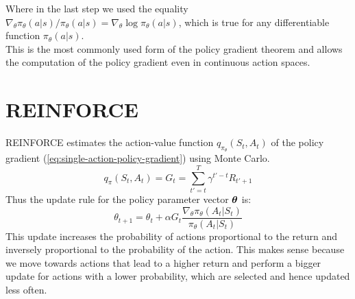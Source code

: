 Where in the last step we used the equality $\nabla_{\theta} \pi_{\theta}(a|s) / \pi_{\theta}(a|s) = \nabla_{\theta} \log \pi_{\theta}(a|s)$, which is true for any differentiable function $\pi_{\theta}(a|s)$.\\ This is the most commonly used form of the policy gradient theorem and allows the computation of the policy gradient even in continuous action spaces.

\section{REINFORCE}
REINFORCE estimates the action-value function $q_{\pi_{\theta}}(S_t, A_t)$ of the policy gradient (\ref{eq:single-action-policy-gradient}) using Monte Carlo.
\begin{equation}
    q_{\pi}(S_t, A_t) = G_t = \sum_{t'=t}^T \gamma^{t'-t} R_{t' + 1}
\end{equation}
Thus the update rule for the policy parameter vector $\boldsymbol{\theta}$ is:
\begin{equation}
    \theta_{t+1} = \theta_t + \alpha G_t \frac{\nabla_{\theta} \pi_{\theta}(A_t|S_t)}{\pi_{\theta}(A_t|S_t)}
    \label{eq:reinforce-update}
\end{equation}
This update increases the probability of actions proportional to the return and inversely proportional to the probability of the action. This makes sense because we move towards actions that lead to a higher return and perform a bigger update for actions with a lower probability, which are selected and hence updated less often.

